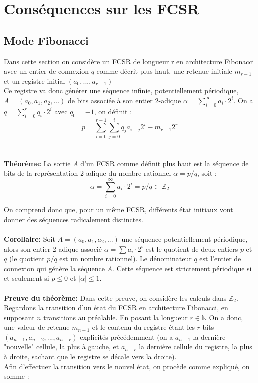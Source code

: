 \documentclass[11pt]{report}
\begin{document}
	\section{Conséquences sur les FCSR}
	\subsection{Mode Fibonacci}
	Dans cette section on considère un FCSR de longueur r en architecture Fibonacci avec un entier de connexion $q$ comme décrit plus haut, une retenue initiale $m_{r-1}$ et un registre initial $(a_0,...,a_{r-1})$ 
	\\
	Ce registre va donc générer une séquence infinie, potentiellement périodique, $A = (a_0,a_1,a_2,...)$ de bits associée à son entier 2-adique $\alpha = \sum_{i=0}^\infty a_i \cdot 2^i$.
	On a $q = \sum_{i=0}^r q_i \cdot 2^i$ avec $q_0 = -1$, on définit : 
	\[
	p= \sum_{i=0}^{r-1} \sum_{j=0}^i q_ja_{i-j}2^i - m_{r-1}2^r
	\]
	\\
	\\
	\textbf{Théorème:}
	La sortie $A$ d'un FCSR comme définit plus haut est la séquence de bits de la représentation 2-adique du nombre rationnel $\alpha = p/q$, soit :
	\[
	\alpha = \sum_{i=0}^\infty a_i \cdot 2^i = p/q \in \, \mathbb{Z}_2
	\]	
	
	On comprend donc que, pour un même FCSR, différents état initiaux vont donner des séquences radicalement distinctes. 
	\\
	\\
	\textbf{Corollaire:}
	Soit $A=(a_0,a_1,a_2,...)$ une séquence potentiellement périodique, alors son entier 2-adique associé $\alpha = \sum a_i \cdot 2^i$ est le quotient de deux entiers $p$ et $q$ (le quotient $p/q$ est un nombre rationnel). Le dénominateur $q$ est l'entier de connexion qui génère la séquence $A$. Cette séquence est strictement périodique si et seulement si $p \leq 0$ et $|\alpha| \leq 1$.
	\\
	\\
	\textbf{Preuve du théorème:}
	Dans cette preuve, on considère les calculs dans $\mathbb{Z}_2$. Regardons la transition d'un état du FCSR en architecture Fibonacci, en supposant $n$ transitions au préalable. En posant la longueur $r \in \mathbb{N}$ On a donc, une valeur de retenue $m_{n-1}$ et le contenu du registre étant les $r$ bits $(a_{n-1},a_{n-2},...,a_{n-r})$ explicités précédemment (on a $a_{n-1}$ la dernière "nouvelle" cellule, la plus à gauche, et $a_{n-r}$ la dernière cellule du registre, la plus à droite, sachant que le registre se décale vers la droite). 
	\\
	Afin d'effectuer la transition vers le nouvel état, on procède comme expliqué, on somme : 
	
\end{document}
